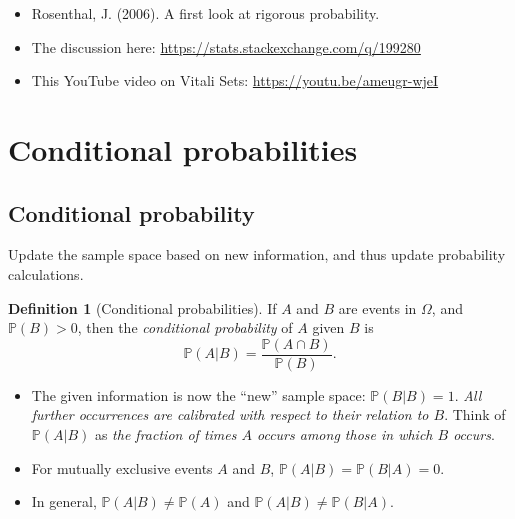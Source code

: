 \documentclass[
]{book}
\providecommand{\tightlist}{%
  \setlength{\itemsep}{0pt}\setlength{\parskip}{0pt}}
\newcommand{\bbP}{\mathbb{P}}
\theoremstyle{definition}
\newtheorem{definition}{Definition}[chapter]
\theoremstyle{definition}
\theoremstyle{definition}
\theoremstyle{definition}
\theoremstyle{remark}
\begin{document}
\begin{itemize}
\tightlist
\item
  Rosenthal, J. (2006). A first look at rigorous probability.
\item
  The discussion here: \url{https://stats.stackexchange.com/q/199280}
\item
  This YouTube video on Vitali Sets: \url{https://youtu.be/ameugr-wjeI}
\end{itemize}

\hypertarget{conditional-probabilities}{%
\section{Conditional probabilities}\label{conditional-probabilities}}

\hypertarget{conditional-probability}{%
\subsection{Conditional probability}\label{conditional-probability}}

Update the sample space based on new information, and thus update probability calculations.

\begin{definition}[Conditional probabilities]
If \(A\) and \(B\) are events in \(\Omega\), and \(\bbP(B)>0\), then the \emph{conditional probability} of \(A\) given \(B\) is
\[
  \bbP(A | B) = \frac{\bbP(A \cap B)}{\bbP(B)}.
\]
\end{definition}

\begin{itemize}
\tightlist
\item
  The given information is now the ``new'' sample space: \(\bbP(B | B) = 1\). \emph{All further occurrences are calibrated with respect to their relation to \(B\)}. Think of \(\bbP(A | B)\) as \emph{the fraction of times \(A\) occurs among those in which \(B\) occurs}.
\item
  For mutually exclusive events \(A\) and \(B\), \(\bbP(A | B)=\bbP(B | A)=0\).
\item
  In general, \(\bbP(A | B) \neq \bbP(A)\) and \(\bbP(A | B) \neq \bbP(B | A)\).
\end{itemize}
\end{document}
